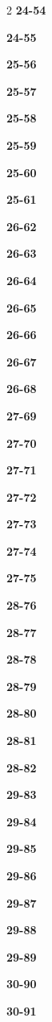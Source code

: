 \documentclass[10pt,a4paper]{article}
\begin{document}
\begin{multicols}{2}
\noindent\textbf{24-54}\ \par
\noindent\textbf{24-55}\ \par
\noindent\textbf{25-56}\ \par
\noindent\textbf{25-57}\ \par
\noindent\textbf{25-58}\ \par
\noindent\textbf{25-59}\ \par
\noindent\textbf{25-60}\ \par
\noindent\textbf{25-61}\ \par
\noindent\textbf{26-62}\ \par
\noindent\textbf{26-63}\ \par
\noindent\textbf{26-64}\ \par
\noindent\textbf{26-65}\ \par
\noindent\textbf{26-66}\ \par
\noindent\textbf{26-67}\ \par
\noindent\textbf{26-68}\ \par
\noindent\textbf{27-69}\ \par
\noindent\textbf{27-70}\ \par
\noindent\textbf{27-71}\ \par
\noindent\textbf{27-72}\ \par
\noindent\textbf{27-73}\ \par
\noindent\textbf{27-74}\ \par
\noindent\textbf{27-75}\ \par
\noindent\textbf{28-76}\ \par
\noindent\textbf{28-77}\ \par
\noindent\textbf{28-78}\ \par
\noindent\textbf{28-79}\ \par
\noindent\textbf{28-80}\ \par
\noindent\textbf{28-81}\ \par
\noindent\textbf{28-82}\ \par
\noindent\textbf{29-83}\ \par
\noindent\textbf{29-84}\ \par
\noindent\textbf{29-85}\ \par
\noindent\textbf{29-86}\ \par
\noindent\textbf{29-87}\ \par
\noindent\textbf{29-88}\ \par
\noindent\textbf{29-89}\ \par
\noindent\textbf{30-90}\ \par
\noindent\textbf{30-91}\ \par

\end{multicols}
\end{document}
